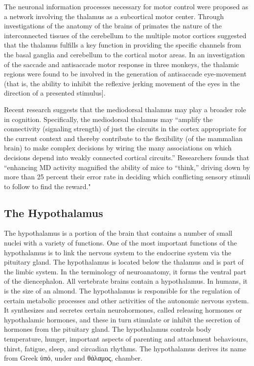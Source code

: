 The neuronal information processes necessary for motor control were proposed as a network involving the thalamus as a subcortical motor center. Through investigations of the anatomy of the brains of primates the nature of the interconnected tissues of the cerebellum to the multiple motor cortices suggested that the thalamus fulfills a key function in providing the specific channels from the basal ganglia and cerebellum to the cortical motor areas. In an investigation of the saccade and antisaccade motor response in three monkeys, the thalamic regions were found to be involved in the generation of antisaccade eye-movement (that is, the ability to inhibit the reflexive jerking movement of the eyes in the direction of a presented stimulus{]}.

Recent research suggests that the mediodorsal thalamus may play a broader role in cognition. Specifically, the mediodorsal thalamus may ``amplify the connectivity (signaling strength) of just the circuits in the cortex appropriate for the current context and thereby contribute to the flexibility (of the mammalian brain) to make complex decisions by wiring the many associations on which decisions depend into weakly connected cortical circuits.'' Researchers founds that ``enhancing MD activity magnified the ability of mice to ``think,'' driving down by more than 25 percent their error rate in deciding which conflicting sensory stimuli to follow to find the reward."

\hypertarget{the-hypothalamus}{%
\subsection{The Hypothalamus}\label{the-hypothalamus}}

The hypothalamus is a portion of the brain that contains a number of small nuclei with a variety of functions. One of the most important functions of the hypothalamus is to link the nervous system to the endocrine system via the pituitary gland. The hypothalamus is located below the thalamus and is part of the limbic system. In the terminology of neuroanatomy, it forms the ventral part of the diencephalon. All vertebrate brains contain a hypothalamus. In humans, it is the size of an almond. The hypothalamus is responsible for the regulation of certain metabolic processes and other activities of the autonomic nervous system. It synthesizes and secretes certain neurohormones, called releasing hormones or hypothalamic hormones, and these in turn stimulate or inhibit the secretion of hormones from the pituitary gland. The hypothalamus controls body temperature, hunger, important aspects of parenting and attachment behaviours, thirst, fatigue, sleep, and circadian rhythms. The hypothalamus derives its name from Greek ὑπό, under and θάλαμος, chamber.


